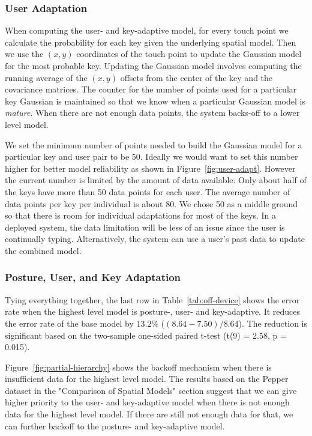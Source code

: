 \documentclass{sigchi}
\begin{document}
\subsubsection{User Adaptation}
When computing the user- and key-adaptive model, for every touch point
we calculate the probability for each key given the underlying spatial model.
Then we use the $(x, y)$ coordinates of the touch point to update the Gaussian model for the most probable key. Updating the Gaussian model involves computing the running average of the $(x, y)$ offsets from the center of the key and the covariance matrices. The counter for the number of points used for a particular key Gaussian is maintained so that we
know when a particular Gaussian model is \textit{mature}. When there are not enough data points, the system backs-off to a lower level model.

We set the minimum number of points needed to build the
Gaussian model for a particular key and user pair to be 50.
Ideally we would want to set this number higher for better model reliability as 
shown in Figure~\ref{fig:user-adapt}. However the current number is limited by 
the amount of data available.  Only about half of the keys
have more than 50 data points for each user. The average number of data 
points per key per individual is about 80. We chose 50 as a middle ground so
that there is room for individual adaptations for most of the keys. In a deployed system, 
the data limitation will be less of an issue since the user is continually
typing. Alternatively, the system can use a user's past data to update the
combined model.

\subsubsection{Posture, User, and Key Adaptation}
Tying everything together, the last row in Table~\ref{tab:off-device} shows the 
error rate when the highest level model is posture-, user- and key-adaptive.
It reduces the error rate of the base model by 13.2\% ($(8.64 - 7.50) / 8.64$). The reduction is significant based on
the two-sample one-sided paired t-test (t(9) = 2.58, p = 0.015).

Figure~\ref{fig:partial-hierarchy} shows the backoff mechanism when there is
insufficient data for the highest level model. The results based on the Pepper
dataset in the "Comparison of Spatial Models" section suggest that we can give higher priority to the user- and key-adaptive model when there is not enough data for the highest level model. If there are still not enough data for that, we 
can further backoff to the posture- and key-adaptive model. 
\end{document}
